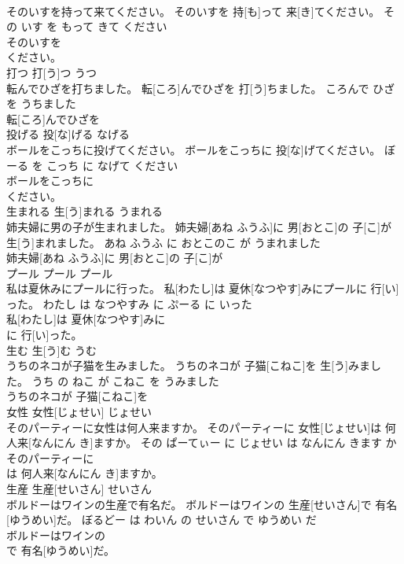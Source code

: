 \documentclass[8pt]{extreport}
\begin{document}
\begin{CJK}{UTF8}{min}
\\	そのいすを持って来てください。	そのいすを 持[も]って 来[き]てください。	その いす を もって きて ください	
\\	そのいすを
\\	ください。		
\\	打つ	打[う]つ	うつ	
\\	転んでひざを打ちました。	転[ころ]んでひざを 打[う]ちました。	ころんで ひざ を うちました	
\\	転[ころ]んでひざを
\\	投げる	投[な]げる	なげる	
\\	ボールをこっちに投げてください。	ボールをこっちに 投[な]げてください。	ぼーる を こっち に なげて ください	
\\	ボールをこっちに
\\	ください。		
\\	生まれる	生[う]まれる	うまれる	
\\	姉夫婦に男の子が生まれました。	姉夫婦[あね ふうふ]に 男[おとこ]の 子[こ]が 生[う]まれました。	あね ふうふ に おとこのこ が うまれました	
\\	姉夫婦[あね ふうふ]に 男[おとこ]の 子[こ]が
\\	プール	プール	プール	
\\	私は夏休みにプールに行った。	私[わたし]は 夏休[なつやす]みにプールに 行[い]った。	わたし は なつやすみ に ぷーる に いった	
\\	私[わたし]は 夏休[なつやす]みに
\\	に 行[い]った。		
\\	生む	生[う]む	うむ	
\\	うちのネコが子猫を生みました。	うちのネコが 子猫[こねこ]を 生[う]みました。	うち の ねこ が こねこ を うみました	
\\	うちのネコが 子猫[こねこ]を
\\	女性	女性[じょせい]	じょせい	
\\	そのパーティーに女性は何人来ますか。	そのパーティーに 女性[じょせい]は 何人来[なんにん き]ますか。	その ぱーてぃー に じょせい は なんにん きます か	
\\	そのパーティーに
\\	は 何人来[なんにん き]ますか。		
\\	生産	生産[せいさん]	せいさん	
\\	ボルドーはワインの生産で有名だ。	ボルドーはワインの 生産[せいさん]で 有名[ゆうめい]だ。	ぼるどー は わいん の せいさん で ゆうめい だ	
\\	ボルドーはワインの
\\	で 有名[ゆうめい]だ。		

\end{CJK}
\end{document}
